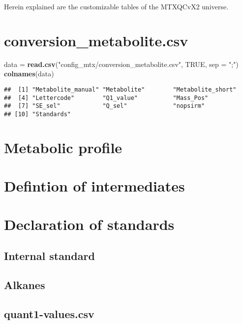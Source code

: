 \documentclass[]{book}
\newenvironment{Shaded}{\begin{snugshade}}{\end{snugshade}}
\newcommand{\KeywordTok}[1]{\textcolor[rgb]{0.13,0.29,0.53}{\textbf{#1}}}
\newcommand{\DataTypeTok}[1]{\textcolor[rgb]{0.13,0.29,0.53}{#1}}
\newcommand{\StringTok}[1]{\textcolor[rgb]{0.31,0.60,0.02}{#1}}
\newcommand{\OtherTok}[1]{\textcolor[rgb]{0.56,0.35,0.01}{#1}}
\newcommand{\NormalTok}[1]{#1}
\theoremstyle{definition}
\theoremstyle{definition}
\theoremstyle{definition}
\theoremstyle{remark}
\begin{document}
Herein explained are the customizable tables of the MTXQCvX2 universe.

\section{conversion\_metabolite.csv}\label{conversion_metabolite.csv-1}

\begin{Shaded}
\begin{Highlighting}[]
\NormalTok{data =}\StringTok{ }\KeywordTok{read.csv}\NormalTok{(}\StringTok{"config_mtx/conversion_metabolite.csv"}\NormalTok{, }\OtherTok{TRUE}\NormalTok{, }\DataTypeTok{sep =} \StringTok{";"}\NormalTok{)}
\KeywordTok{colnames}\NormalTok{(data)}
\end{Highlighting}
\end{Shaded}

\begin{verbatim}
##  [1] "Metabolite_manual" "Metabolite"        "Metabolite_short" 
##  [4] "Lettercode"        "Q1_value"          "Mass_Pos"         
##  [7] "SE_sel"            "Q_sel"             "nopsirm"          
## [10] "Standards"
\end{verbatim}

\section{Metabolic profile}\label{metabolic-profile}

\section{Defintion of intermediates}\label{defintion-of-intermediates}

\section{Declaration of standards}\label{declaration-of-standards}

\subsection{Internal standard}\label{internal-standard-1}

\subsection{Alkanes}\label{alkanes}

\subsection{quant1-values.csv}\label{quant1-values.csv}
\end{document}
